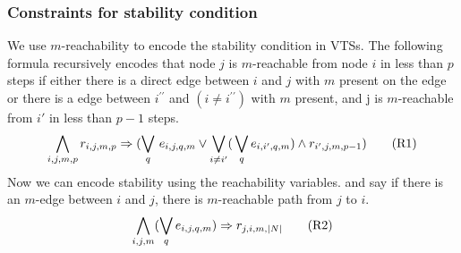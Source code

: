 \subsubsection{Constraints for stability condition}
%
We use $m$-reachability to encode the stability condition in VTSs.
%
The following formula recursively encodes that node $j$ is $m$-reachable from node $i$ in less than $p$ steps
if either there is a direct edge between $i$ and $j$ with $m$ present on the edge or there is a edge between $i^{\prime \prime}$ and
$(i \neq i^{\prime \prime})$ with $m$ present, and j is $m$-reachable from $i'$ in less than $p-1$ steps.
%
\begin{align}
  \bigwedge\limits_{i,j,m,p} r_{i,j,m,p} \Rightarrow (\bigvee_{q} \, e_{i,j,q,m} \lor \bigvee_{i\neq i^{\prime}} ( \, \bigvee_{q} e_{i,i^{\prime},q,m}) \land r_{i^{\prime},j,m,p-1} )
  \tag{R1}\label{eq:reach1}
\end{align}
Now we can encode stability using the reachability variables.
and say if there is an $m$-edge between $i$ and $j$, there is
$m$-reachable path from $j$ to $i$.
\begin{align}
 \bigwedge\limits_{i,j,m} (\bigvee_{q} e_{i,j,q,m}) \Rightarrow r_{j,i,m,|N|}
  \tag{R2}\label{eq:reach2}
\end{align}







